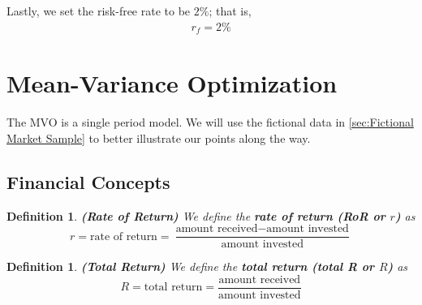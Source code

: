 \documentclass[13pt]{article}
\newtheorem{definition}[theorem]{Definition}
\theoremstyle{definition}
\theoremstyle{remark}
\begin{document}
Lastly, we set the risk-free rate to be $2\%$; that is,
\begin{align}
    r_f=2\% \label{eq:risk free rate}
\end{align}

\newpage
\section{Mean-Variance Optimization}
The MVO is a single period model. We will use the fictional data in \cref{sec:Fictional Market Sample} to better illustrate our points along the way.

\subsection{Financial Concepts}\label{sec:financial concepts}
\begin{definition}\textbf{(Rate of Return)} We define the \textbf{rate of return (RoR or $r$)} as 
\[
r=\text{rate of return} = \frac{\text{amount received}-\text{amount invested}}{\text{amount invested}}
\]
\end{definition}
\begin{definition}\textbf{(Total Return)} We define the \textbf{total return (total R or $R$)} as 
\[
R=\text{total return} = \frac{\text{amount received}}{\text{amount invested}}
\]
\end{definition}
\end{document}
